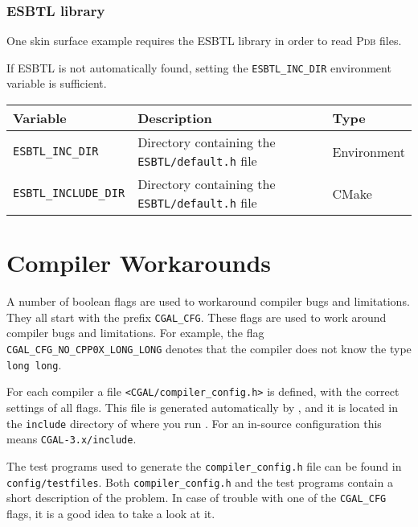 \subsubsection{ESBTL library}

One skin surface example requires the ESBTL library in order to read \textsc{Pdb} files.

If ESBTL is not automatically found, setting the \texttt{ESBTL\_INC\_DIR} 
environment variable is sufficient.

{\ccTexHtml{\small}{}
\renewcommand{\arraystretch}{1.3}
\gdef\lcTabularBorder{2}
\begin{tabular}{|l|l|l|} \hline
  \textbf{Variable}                    & \textbf{Description}                                         & \textbf{Type}\\\hline\hline
  \texttt{ESBTL\_INC\_DIR}     & Directory containing the \texttt{ESBTL/default.h} file & Environment\\\hline
  \texttt{ESBTL\_INCLUDE\_DIR}     & Directory containing the \texttt{ESBTL/default.h} file & CMake\\\hline
\end{tabular}
}

\section{Compiler Workarounds}

A number of boolean flags are used to workaround compiler bugs and
limitations. They all  start
with the prefix \texttt{CGAL\_CFG}. These flags are used to work
around compiler bugs and limitations. For example, the flag
\texttt{CGAL\_CFG\_NO\_CPP0X\_LONG\_LONG} denotes that the compiler does not
know the type \texttt{long long}.

For each compiler a file \texttt{<CGAL/compiler\_config.h>}
 is defined, with the correct
settings of all flags. This file is generated automatically by 
\cmake, and it is located in the \texttt{include} directory of
where you run \cmake. For an in-source configuration this means
\texttt{CGAL-3.x/include}.

The test programs used to generate the \texttt{compiler\_config.h}
file can be found in \texttt{config/testfiles}.
 Both
\texttt{compiler\_config.h} and the test programs contain a short
description of the problem. In case of trouble with one of the
\texttt{CGAL\_CFG} flags, it is a good idea to take a look at it.


